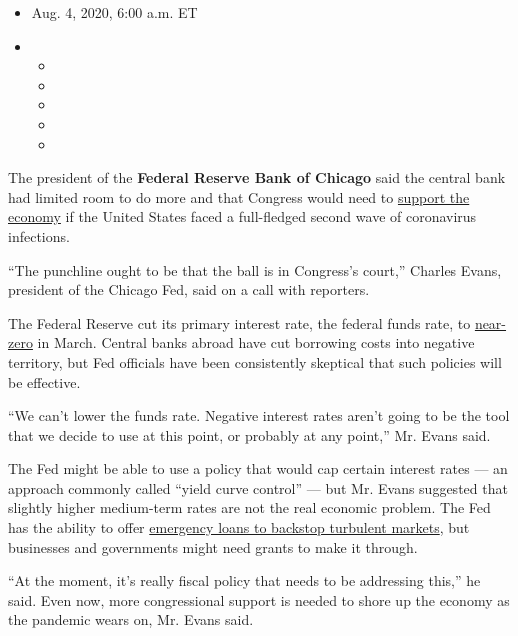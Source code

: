 \begin{itemize}
\item
  Aug. 4, 2020, 6:00 a.m. ET
\item
  \begin{itemize}
  \item
  \item
  \item
  \item
  \item
  \end{itemize}
\end{itemize}

The president of the \textbf{Federal Reserve Bank of Chicago} said the
central bank had limited room to do more and that Congress would need to
\href{https://www.nytimes3xbfgragh.onion/2020/08/03/business/fed-official-says-a-hard-lockdown-could-get-virus-under-control.html}{support
the economy} if the United States faced a full-fledged second wave of
coronavirus infections.

``The punchline ought to be that the ball is in Congress's court,''
Charles Evans, president of the Chicago Fed, said on a call with
reporters.

The Federal Reserve cut its primary interest rate, the federal funds
rate, to
\href{https://www.nytimes3xbfgragh.onion/2020/07/29/business/economy/federal-reserve-meeting-interest-rates.html}{near-zero}
in March. Central banks abroad have cut borrowing costs into negative
territory, but Fed officials have been consistently skeptical that such
policies will be effective.

``We can't lower the funds rate. Negative interest rates aren't going to
be the tool that we decide to use at this point, or probably at any
point,'' Mr. Evans said.

The Fed might be able to use a policy that would cap certain interest
rates --- an approach commonly called ``yield curve control'' --- but
Mr. Evans suggested that slightly higher medium-term rates are not the
real economic problem. The Fed has the ability to offer
\href{https://www.nytimes3xbfgragh.onion/2020/07/28/business/economy/coronavirus-federal-reserve-policy.html}{emergency
loans to backstop turbulent markets}, but businesses and governments
might need grants to make it through.

``At the moment, it's really fiscal policy that needs to be addressing
this,'' he said. Even now, more congressional support is needed to shore
up the economy as the pandemic wears on, Mr. Evans said.

